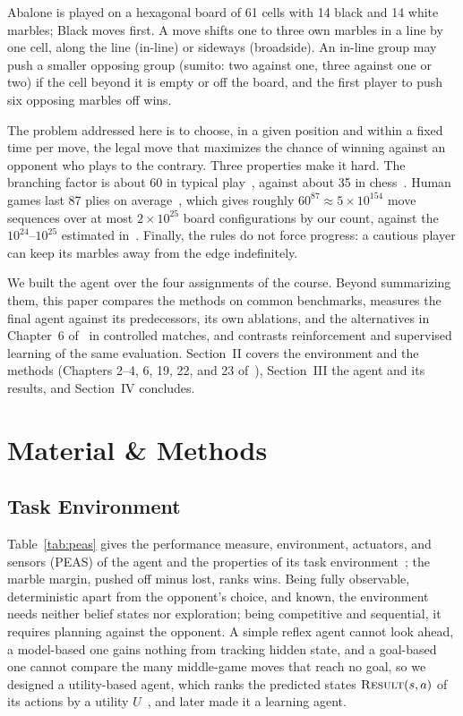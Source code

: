 \documentclass[conference,a4paper]{IEEEtran}
\begin{document}
Abalone is played on a hexagonal board of 61 cells with 14 black and 14 white marbles; Black moves first. A move shifts one to three own marbles in a line by one cell, along the line (in-line) or sideways (broadside). An in-line group may push a smaller opposing group (sumito: two against one, three against one or two) if the cell beyond it is empty or off the board, and the first player to push six opposing marbles off wins.

The problem addressed here is to choose, in a given position and within a fixed time per move, the legal move that maximizes the chance of winning against an opponent who plays to the contrary. Three properties make it hard. The branching factor is about 60 in typical play~\cite{lemmens2005}, against about 35 in chess~\cite{russell2021}. Human games last 87 plies on average~\cite{lemmens2005}, which gives roughly $60^{87}\approx5\times10^{154}$ move sequences over at most $2\times10^{25}$ board configurations by our count, against the $10^{24}$--$10^{25}$ estimated in~\cite{chorus2009}. Finally, the rules do not force progress: a cautious player can keep its marbles away from the edge indefinitely.

We built the agent over the four assignments of the course. Beyond summarizing them, this paper compares the methods on common benchmarks, measures the final agent against its predecessors, its own ablations, and the alternatives in Chapter~6 of~\cite{russell2021} in controlled matches, and contrasts reinforcement and supervised learning of the same evaluation. Section~II covers the environment and the methods (Chapters 2--4, 6, 19, 22, and 23 of~\cite{russell2021}), Section~III the agent and its results, and Section~IV concludes.

\section{Material \& Methods}

\subsection{Task Environment}
Table~\ref{tab:peas} gives the performance measure, environment, actuators, and sensors (PEAS) of the agent and the properties of its task environment~\cite{russell2021}; the marble margin, pushed off minus lost, ranks wins. Being fully observable, deterministic apart from the opponent's choice, and known, the environment needs neither belief states nor exploration; being competitive and sequential, it requires planning against the opponent. A simple reflex agent cannot look ahead, a model-based one gains nothing from tracking hidden state, and a goal-based one cannot compare the many middle-game moves that reach no goal, so we designed a utility-based agent, which ranks the predicted states $\textsc{Result}(s,a)$ of its actions by a utility $U$~\cite{russell2021}, and later made it a learning agent.
\end{document}
